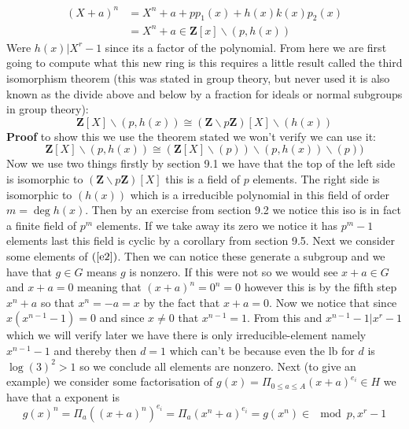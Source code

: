 \documentclass[../Main.tex]{subfiles}
\begin{document}
\begin{enumerate}
\begin{equation}
    \begin{split}
        (X+a)^n &= X^n+a+pp_1(x)+h(x)k(x)p_2(x)\\
                &= X^n+a\in \mathbf{Z}[x]\backslash(p,h(x))
                \label{e3}
    \end{split}
\end{equation}
Were $h(x)|X^r-1$ since its a factor of the polynomial. From here we are first going to compute what this new ring is this requires a little result called the third isomorphism theorem (this was stated in group theory, but never used it is also known as the divide above and below by a fraction for ideals or normal subgroups in group theory): 
\begin{equation}
    \mathbf{Z}[X]\backslash(p,h(x))\cong (\mathbf{Z}\backslash p\mathbf{Z})[X]\backslash(h(x))
\end{equation}
\textbf{Proof} to show this we use the theorem stated we won't verify we can use it:
\begin{equation*}
    \mathbf{Z}[X]\backslash(p,h(x))\cong (\mathbf{Z}[X]\backslash (p))\backslash (p,h(x))\backslash (p)) 
\end{equation*}
Now we use two things firstly by section 9.1 we have that the top of the left side is isomorphic to $(\mathbf{Z}\backslash p \mathbf{Z})[X]$ this is a field of $p$ elements. The right side is isomorphic to $(h(x))$ which is a irreducible polynomial in this field of order $m=\deg{h(x)}$. Then by an exercise from section 9.2 we notice this iso is in fact a finite field of $p^m$ elements. If we take away its zero we notice it has $p^m-1$ elements last this field is cyclic by a corollary from section 9.5. Next we consider some elements of $(\ref{e2})$. Then we can notice these generate a subgroup and we have that $g\in G$  means $g$ is nonzero. If this were not so we would see $x+a\in G$ and $x+a=0$ meaning that $(x+a)^n=0^n=0$ however this is by the fifth step $x^n+a$ so that $x^n=-a=x$ by the fact that $x+a=0$. Now we notice that since $x(x^{n-1}-1)=0$ and since $x\neq 0$ that $x^{n-1}=1$. From this and  $x^{n-1}-1|x^r-1$  which we will verify later we have there is only
irreducible-element namely $x^{n-1}-1$ and thereby then $d=1$ which can't be because even the lb for $d$ is $\log(3)^2>1$ so we conclude all elements are nonzero. Next (to give an example) we consider some factorisation of $g(x)=\Pi_{0\leq a \leq A}(x+a)^{e_i}\in H$ we have that a exponent is 
\begin{equation}
g(x)^n = \Pi_a((x+a)^n)^{e_i}=\Pi_a(x^n+a)^{e_i} = g(x^n) \in \mod {p,x^r-1}

\end{equation}
\end{enumerate}
\end{document}
